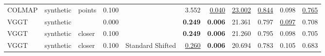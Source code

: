 \begin{table}[H]
\begin{tabular}{lllrlrrrrrr}
COLMAP & synthetic & points & 0.100 &  & 3.552 & \underline{0.040} & \underline{23.002} & \underline{0.844} & 0.098 & \underline{0.765} \\
VGGT & synthetic &  & 0.000 &  & \textbf{0.249} & \textbf{0.006} & 21.361 & 0.797 & \underline{0.097} & 0.708 \\
VGGT & synthetic & closer & 0.100 &  & \textbf{0.249} & \textbf{0.006} & 21.260 & 0.795 & 0.098 & 0.705 \\
VGGT & synthetic & closer & 0.100 & Standard Shifted & \underline{0.260} & \textbf{0.006} & 20.694 & 0.783 & 0.105 & 0.683 \\
\bottomrule
\end{tabular}
\end{table}